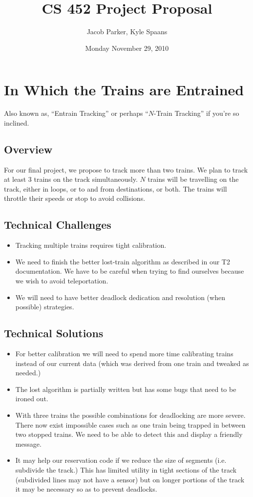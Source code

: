 \documentclass{article}
\title{CS 452 Project Proposal}
\author{Jacob Parker, Kyle Spaans}
\date{Monday November 29, 2010}
\begin{document}
\maketitle

\section*{In Which the Trains are Entrained}
Also known as, ``Entrain Tracking'' or perhaps ``$N$-Train Tracking'' if you're
so inclined.

\subsection*{Overview}
For our final project, we propose to track more than two trains. We plan to
track at least 3 trains on the track simultaneously. $N$ trains will be
travelling on the track, either in loops, or to and from destinations, or both.
The trains will throttle their speeds or stop to avoid collisions.

\subsection*{Technical Challenges}
\begin{itemize}
\item Tracking multiple trains requires tight calibration.
\item We need to finish the better lost-train algorithm as described in our T2
documentation. We have to be careful when trying to find ourselves because we
wish to avoid teleportation.
\item We will need to have better deadlock dedication and resolution (when
possible) strategies.
\end{itemize} 

\subsection*{Technical Solutions}
\begin{itemize}
\item For better calibration we will need to spend more time calibrating trains
instead of our current data (which was derived from one train and tweaked as
needed.)
\item The lost algorithm is partially written but has some bugs that need to be
ironed out. 
\item With three trains the possible combinations for deadlocking are more
severe. There now exist impossible cases such as one train being trapped in
between two stopped trains. We need to be able to detect this and display a
friendly message.
\item It may help our reservation code if we reduce the size of segments (i.e.
subdivide the track.) This has limited utility in tight sections of the track
(subdivided lines may not have a sensor) but on longer portions of the track it
may be necessary so as to prevent deadlocks.
\end{itemize}
\end{document}
